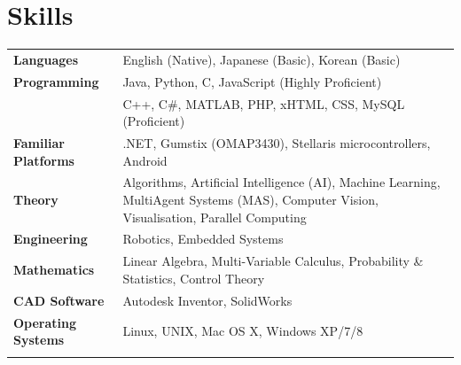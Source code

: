 \documentclass[10pt, a4paper]{report}
\begin{document}
\section*{Skills}

\begin{tabular}{lp{14cm}}
{\bf Languages} & English (Native), Japanese (Basic), Korean (Basic)\\  \addlinespace
{\bf Programming} &  Java, Python, C, JavaScript (Highly Proficient) \\  \addlinespace
{\bf } &  C++, C\#, MATLAB, PHP, xHTML, CSS, MySQL (Proficient) \\  \addlinespace
{\bf Familiar Platforms} & .NET, Gumstix (OMAP3430), Stellaris microcontrollers, Android \\ \addlinespace
{\bf Theory} & Algorithms, Artificial Intelligence (AI), Machine Learning, Multi\-Agent Systems (MAS), Computer Vision, Visualisation, Parallel Computing \\  \addlinespace
{\bf Engineering} & Robotics, Embedded Systems \\  \addlinespace
{\bf Mathematics} & Linear Algebra,  Multi-Variable Calculus, Probability \& Statistics, Control Theory \\  
{\bf CAD Software} & Autodesk Inventor, SolidWorks \\  \addlinespace
{\bf Operating Systems} &  Linux, UNIX, Mac OS X, Windows XP/7/8 \\  \addlinespace
\addlinespace
\end{tabular}
\end{document}
